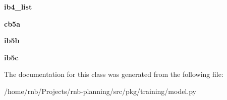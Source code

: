 \begin{DoxyCompactItemize}
{\bfseries ib4\+\_\+list}
\item 
\mbox{\label{classrnb-planning_1_1src_1_1pkg_1_1training_1_1model_1_1_res_net_a02d866622a648e30257917d8715ebce2}} 
{\bfseries cb5a}
\item 
\mbox{\label{classrnb-planning_1_1src_1_1pkg_1_1training_1_1model_1_1_res_net_a9c479e1778b71f3514e52dad5429c27a}} 
{\bfseries ib5b}
\item 
\mbox{\label{classrnb-planning_1_1src_1_1pkg_1_1training_1_1model_1_1_res_net_aea2ef49569360159e8b6da4b22ab0c58}} 
{\bfseries ib5c}
\end{DoxyCompactItemize}


The documentation for this class was generated from the following file\+:\begin{DoxyCompactItemize}
\item 
/home/rnb/\+Projects/rnb-\/planning/src/pkg/training/model.\+py\end{DoxyCompactItemize}
